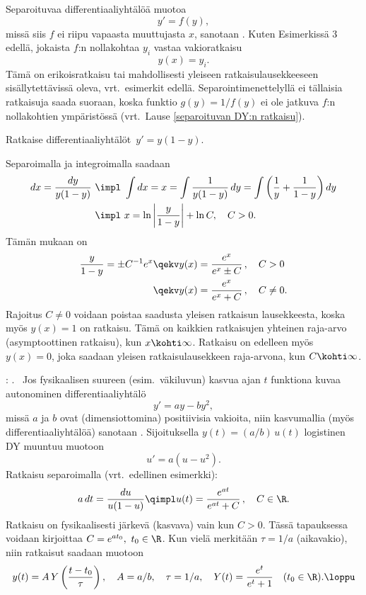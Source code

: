 Separoituvaa differentiaaliyhtälöä muotoa
\[
y'=f(y),
\]
missä siis $f$ ei riipu vapaasta muuttujasta $x$, sanotaan . Kuten 
Esimerkissä 3 edellä, jokaista $f$:n nollakohtaa $y_i$ vastaa vakioratkaisu
\[
y(x)=y_i.
\]
Tämä on erikoisratkaisu tai mahdollisesti yleiseen ratkaisulausekkeeseen sisällytettävissä
oleva, vrt.\ esimerkit edellä. Separointimenettelyllä ei tällaisia ratkaisuja saada suoraan,
koska funktio $g(y)=1/f(y)$ ei ole jatkuva $f$:n nollakohtien ympäristössä 
(vrt.\ Lause \ref{separoituvan DY:n ratkaisu}). 
\begin{Exa} Ratkaise differentiaaliyhtälöt $\,y'=y(1-y)$.
\end{Exa}
\ratk Separoimalla ja integroimalla saadaan
\begin{align*}
dx = \frac{dy}{y(1-y)}\ &\impl\ \int dx = x = \int \frac{1}{y(1-y)}\,dy 
                                            = \int \left(\frac{1}{y}+\frac{1}{1-y}\right)dy \\
                        &\impl\ x = \ln\left|\frac{y}{1-y}\right|+\ln C, \quad C>0.
\end{align*}
Tämän mukaan on
\begin{align*}
\frac{y}{1-y} = \pm C^{-1}e^x &\qekv y(x) = \frac{e^x}{e^x \pm C}\,, \quad C>0 \\
                              &\qekv y(x) = \frac{e^x}{e^x+C}\,,\quad C\neq 0.
\end{align*}
Rajoitus $C \neq 0$ voidaan poistaa saadusta yleisen ratkaisun lausekkeesta, koska myös $y(x)=1$
on ratkaisu. Tämä on kaikkien ratkaisujen yhteinen raja-arvo (asymptoottinen ratkaisu), kun
$x\kohti\infty$. Ratkaisu on edelleen myös $y(x)=0$, joka saadaan yleisen ratkaisulausekkeen
raja-arvona, kun $C\kohti\infty$. \loppu
\begin{Exa}: .  \ Jos
fysikaalisen suureen (esim.\ väkiluvun) kasvua ajan $t$ funktiona kuvaa autonominen
differentiaaliyhtälö
\[
y'=ay-by^2,
\]
missä $a$ ja $b$ ovat (dimensiottomina) positiivisia vakioita, niin kasvumallia 
(myös differentiaaliyhtälöä) sanotaan
. Sijoituksella $y(t)=(a/b)\,u(t)$ logistinen DY muuntuu muotoon
\[
u'=a(u-u^2).
\]
Ratkaisu separoimalla (vrt.\ edellinen esimerkki):
\[
a\,dt = \frac{du}{u(1-u)} \qimpl u(t)=\frac{e^{at}}{e^{at} + C}\,, \quad C\in\R. 
\]
Ratkaisu on fysikaalisesti järkevä (kasvava) vain kun $C>0$. Tässä tapauksessa voidaan 
kirjoittaa $C=e^{at_0},\ t_0\in\R$. Kun vielä merkitään $\tau=1/a$ (aikavakio), niin ratkaisut
saadaan muotoon
\[
y(t)=A\,Y\left(\frac{t-t_0}{\tau}\right), \quad A=a/b, \quad \tau=1/a, \quad 
Y(t)=\frac{e^{t}}{e^{t}+1} \quad (t_0\in\R). \loppu
\]
\end{Exa}
